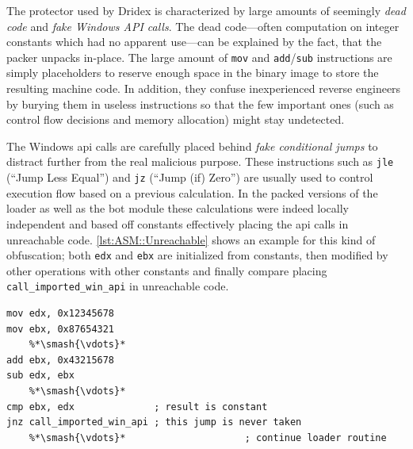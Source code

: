 The protector used by Dridex is characterized by large amounts of seemingly \emph{dead code} and \emph{fake Windows API calls}.
The dead code---often computation on integer constants which had no apparent use---can be explained by the fact, that the packer unpacks in-place.
The large amount of \lstinline|mov| and \lstinline|add|/\lstinline|sub| instructions are simply placeholders to reserve enough space in the binary image to store the resulting machine code.
In addition, they confuse inexperienced reverse engineers by burying them in useless instructions so that the few important ones (such as control flow decisions and memory allocation) might stay undetected.

The Windows \gls{api} calls are carefully placed behind \emph{fake conditional jumps} to distract further from the real malicious purpose.
These instructions such as \lstinline|jle| (``Jump Less Equal'') and \lstinline|jz| (``Jump (if) Zero'') are usually used to control execution flow based on a previous calculation.
In the packed versions of the loader as well as the bot module these calculations were indeed locally independent and based off constants effectively placing the \gls{api} calls in unreachable code.
\autoref{lst:ASM::Unreachable} shows an example for this kind of obfuscation; both \lstinline[style=asm]|edx| and \lstinline[style=asm]|ebx| are initialized from constants, then modified by other operations with other constants and finally compare placing \lstinline|call_imported_win_api| in unreachable code.
\\

\begin{lstlisting}[style=asm, caption={Example: Unreachable Windows \gls{api} calls}, label={lst:ASM::Unreachable}]
mov edx, 0x12345678
mov ebx, 0x87654321
    %*\smash{\vdots}*
add ebx, 0x43215678
sub edx, ebx
    %*\smash{\vdots}*
cmp ebx, edx              ; result is constant
jnz call_imported_win_api ; this jump is never taken
    %*\smash{\vdots}*                     ; continue loader routine
\end{lstlisting}

